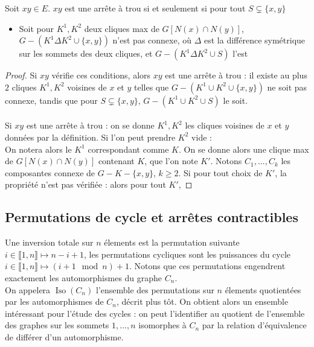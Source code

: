 \documentclass{scrartcl}
\begin{document}
\begin{flushleft}
\begin{prop}
    Soit $xy \in E$. $xy$ est une arrête à trou si et seulement si pour tout $S \subsetneq \{x, y\}$
    \begin{itemize}
        \item Soit pour $K^1, K^2$ deux cliques max de $G[N(x) \cap N(y)]$, $G - (K^1 \Delta K^2 \cup \{x,y\})$ n'est pas connexe,
        où $\Delta$ est la différence symétrique sur les sommets des deux cliques, et $G - (K^1 \Delta K^2 \cup S)$ l'est
    \end{itemize} 
    
\end{prop}

\begin{proof}
    Si $xy$ vérifie ces conditions, alors $xy$ est une arrête à trou : il existe au plus $2$ cliques $K^1, K^2$ voisines de $x$ et $y$
    telles que $G - (K^1 \cup K^2 \cup \{x,y\})$ ne soit pas connexe, tandis que pour $S \subsetneq \{x,y\}$, $G - (K^1 \cup K^2 \cup S)$
    le soit.
    \\~\\
    Si $xy$ est une arrête à trou : on se donne $K^1, K^2$ les cliques voisines de $x$ et $y$ données par la définition.
    Si l'on peut prendre $K^2$ vide :\\
    On notera alors le $K^1$ correspondant comme $K$. On se donne alors une clique max de $G[N(x) \cap N(y)]$ contenant $K$, que l'on note $K'$.
    Notons $C_1, ..., C_k$ les composantes connexe de $G - K - \{x,y\}$, $k \geq 2$. Si pour tout choix de $K'$, la propriété n'est pas
    vérifiée : alors pour tout $K'$, 
\end{proof}

\subsection{Permutations de cycle et arrêtes contractibles}

Une inversion totale sur $n$ élements est la permutation suivante $ i \in \llbracket 1, n \rrbracket \longmapsto n - i + 1$,
les permutations cycliques sont les puissances du cycle $ i \in \llbracket 1, n \rrbracket \longmapsto (i+1 \mod n) + 1$.
Notons que ces permutations engendrent exactement les automorphismes du graphe $C_n$.\\
On appelera $\operatorname*{Iso}(C_n)$ l'ensemble des permutations sur $n$ élements quotientées par les automorphismes de
$C_n$, décrit plus tôt. On obtient alors un ensemble intéressant pour l'étude des cycles : on peut l'identifier
au quotient de l'ensemble des graphes sur les sommets $1, ..., n$ isomorphes à $C_n$ par la relation d'équivalence de différer
d'un automorphisme.


\end{flushleft}
\end{document}
